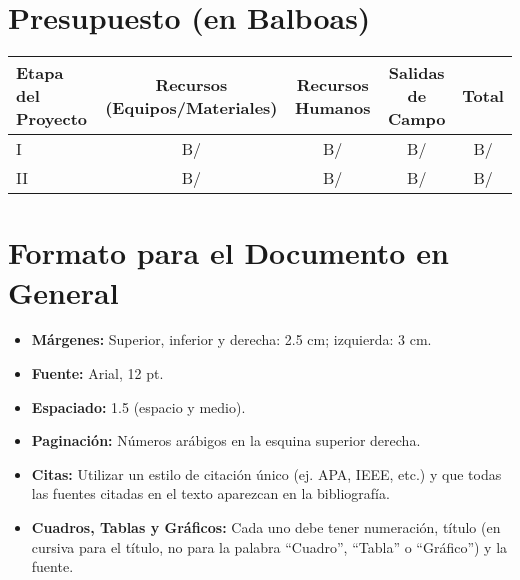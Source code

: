 \documentclass[12pt,a4paper]{article}
\begin{document}
\section{Presupuesto (en Balboas)}
\begin{center}
\begin{tabular}{|l|c|c|c|c|}
\hline
\textbf{Etapa del Proyecto} & \textbf{Recursos (Equipos/Materiales)} & \textbf{Recursos Humanos} & \textbf{Salidas de Campo} & \textbf{Total} \\
\hline
I & B/ \underline{\hspace{1.5cm}} & B/ \underline{\hspace{1.5cm}} & B/ \underline{\hspace{1.5cm}} & B/ \underline{\hspace{1.5cm}} \\
\hline
II & B/ \underline{\hspace{1.5cm}} & B/ \underline{\hspace{1.5cm}} & B/ \underline{\hspace{1.5cm}} & B/ \underline{\hspace{1.5cm}} \\
\hline
\end{tabular}
\end{center}

\section{Formato para el Documento en General}
\begin{itemize}
    \item \textbf{Márgenes:} Superior, inferior y derecha: 2.5 cm; izquierda: 3 cm.
    \item \textbf{Fuente:} Arial, 12 pt.
    \item \textbf{Espaciado:} 1.5 (espacio y medio).
    \item \textbf{Paginación:} Números arábigos en la esquina superior derecha.
    \item \textbf{Citas:} Utilizar un estilo de citación único (ej. APA, IEEE, etc.) y que todas las fuentes citadas en el texto aparezcan en la bibliografía.
    \item \textbf{Cuadros, Tablas y Gráficos:} Cada uno debe tener numeración, título (en cursiva para el título, no para la palabra “Cuadro”, “Tabla” o “Gráfico”) y la fuente.
\end{itemize}
\end{document}

